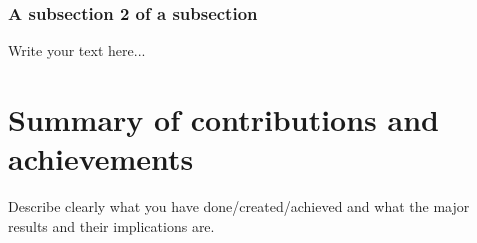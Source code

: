 \subsubsection{A subsection 2 of a subsection}
\label{sec:intro_some_subsub2}
Write your text here...

\section{Summary of contributions and achievements} %
\label{sec:intro_sum_results} %
Describe clearly what you have done/created/achieved and what the major results and their implications are. 
